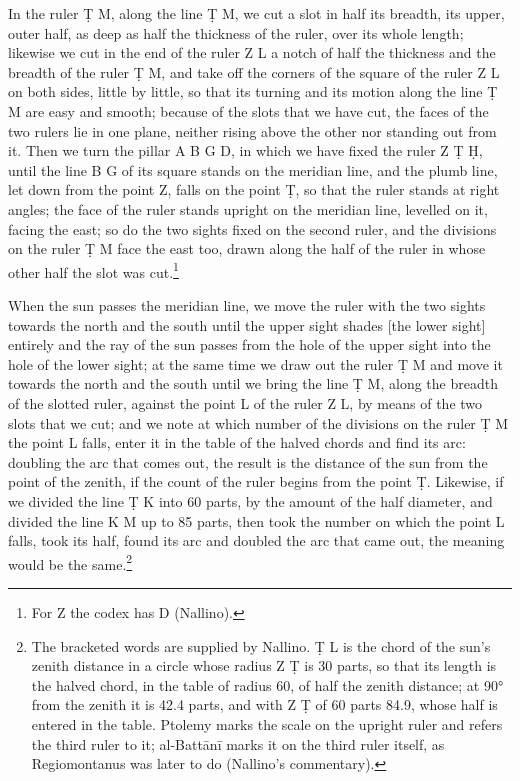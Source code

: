\documentclass[11pt]{article}
\begin{document}
\par In the ruler Ṭ M, along the line Ṭ M, we cut a slot in half its breadth, its upper, outer half, as deep as half the thickness of the ruler, over its whole length; likewise we cut in the end of the ruler Z L a notch of half the thickness and the breadth of the ruler Ṭ M, and take off the corners of the square of the ruler Z L on both sides, little by little, so that its turning and its motion along the line Ṭ M are easy and smooth; because of the slots that we have cut, the faces of the two rulers lie in one plane, neither rising above the other nor standing out from it. Then we turn the pillar A B G D, in which we have fixed the ruler Z Ṭ Ḥ, until the line B G of its square stands on the meridian line, and the plumb line, let down from the point Z, falls on the point Ṭ, so that the ruler stands at right angles; the face of the ruler stands upright on the meridian line, levelled on it, facing the east; so do the two sights fixed on the second ruler, and the divisions on the ruler Ṭ M face the east too, drawn along the half of the ruler in whose other half the slot was cut.\footnote{For Z the codex has D (Nallino).}\par
\par When the sun passes the meridian line, we move the ruler with the two sights towards the north and the south until the upper sight shades [the lower sight] entirely and the ray of the sun passes from the hole of the upper sight into the hole of the lower sight; at the same time we draw out the ruler Ṭ M and move it towards the north and the south until we bring the line Ṭ M, along the breadth of the slotted ruler, against the point L of the ruler Z L, by means of the two slots that we cut; and we note at which number of the divisions on the ruler Ṭ M the point L falls, enter it in the table of the halved chords and find its arc: doubling the arc that comes out, the result is the distance of the sun from the point of the zenith, if the count of the ruler begins from the point Ṭ. Likewise, if we divided the line Ṭ K into 60 parts, by the amount of the half diameter, and divided the line K M up to 85 parts, then took the number on which the point L falls, took its half, found its arc and doubled the arc that came out, the meaning would be the same.\footnote{The bracketed words are supplied by Nallino. Ṭ L is the chord of the sun's zenith distance in a circle whose radius Z Ṭ is 30 parts, so that its length is the halved chord, in the table of radius 60, of half the zenith distance; at 90° from the zenith it is 42.4 parts, and with Z Ṭ of 60 parts 84.9, whose half is entered in the table. Ptolemy marks the scale on the upright ruler and refers the third ruler to it; al-Battānī marks it on the third ruler itself, as Regiomontanus was later to do (Nallino's commentary).}\par
\end{document}
